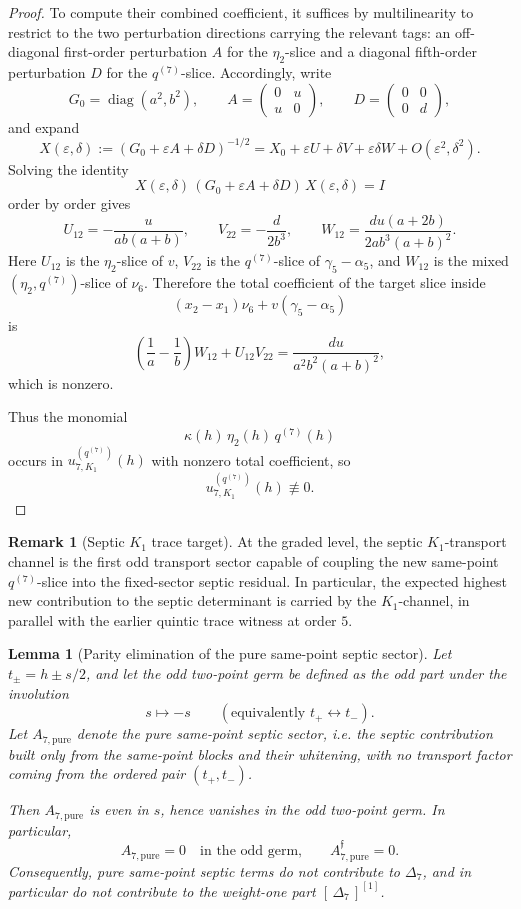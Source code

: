 \documentclass[11pt,a4paper]{amsart}
\theoremstyle{plain}
\newtheorem{lemma}[theorem]{Lemma}
\theoremstyle{definition}
\newtheorem{remark}[theorem]{Remark}
\newcommand{\diag}{\operatorname{diag}}
\begin{document}
\begin{proof}
To compute their combined coefficient, it suffices by multilinearity to
restrict to the two perturbation directions carrying the relevant tags:
an off-diagonal first-order perturbation $A$ for the $\eta_2$-slice and
a diagonal fifth-order perturbation $D$ for the $q^{(7)}$-slice.
Accordingly, write
\[
G_0=\diag(a^2,b^2),
\qquad
A=
\begin{pmatrix}
0&u\\u&0
\end{pmatrix},
\qquad
D=
\begin{pmatrix}
0&0\\0&d
\end{pmatrix},
\]
and expand
\[
X(\varepsilon,\delta):=(G_0+\varepsilon A+\delta D)^{-1/2}
=
X_0+\varepsilon U+\delta V+\varepsilon\delta W+O(\varepsilon^2,\delta^2).
\]
Solving the identity
\[
X(\varepsilon,\delta)\,(G_0+\varepsilon A+\delta D)\,X(\varepsilon,\delta)=I
\]
order by order gives
\[
U_{12}=-\frac{u}{ab(a+b)},
\qquad
V_{22}=-\frac{d}{2b^3},
\qquad
W_{12}=\frac{du(a+2b)}{2ab^3(a+b)^2}.
\]
Here $U_{12}$ is the $\eta_2$-slice of $v$, $V_{22}$ is the
$q^{(7)}$-slice of $\gamma_5-\alpha_5$, and $W_{12}$ is the mixed
$(\eta_2,q^{(7)})$-slice of $\nu_6$. Therefore the total coefficient of the
target slice inside
\[
(x_2-x_1)\nu_6+v(\gamma_5-\alpha_5)
\]
is
\[
\left(\frac1a-\frac1b\right)W_{12}+U_{12}V_{22}
=
\frac{du}{a^2b^2(a+b)^2},
\]
which is nonzero.

Thus the monomial
\[
\kappa(h)\,\eta_2(h)\,q^{(7)}(h)
\]
occurs in $u_{7,K_1}^{(q^{(7)})}(h)$ with nonzero total coefficient, so
\[
u_{7,K_1}^{(q^{(7)})}(h)\not\equiv 0.
\]
\end{proof}

\begin{remark}[Septic $K_1$ trace target]
\label{rem:septic-k1-trace-target}
At the graded level, the septic $K_1$-transport channel is the first odd
transport sector capable of coupling the new same-point $q^{(7)}$-slice into
the fixed-sector septic residual. In particular, the expected highest new
contribution to the septic determinant is carried by the $K_1$-channel, in
parallel with the earlier quintic trace witness at order $5$.
\end{remark}

\begin{lemma}[Parity elimination of the pure same-point septic sector]
\label{lem:parity-elimination-pure-septic}
Let $t_\pm=h\pm s/2$, and let the odd two-point germ be defined as the odd
part under the involution
\[
s\longmapsto -s
\qquad
(\text{equivalently }t_+\leftrightarrow t_-).
\]
Let $A_{7,\mathrm{pure}}$ denote the pure same-point septic sector, i.e. the
septic contribution built only from the same-point blocks and their whitening,
with no transport factor coming from the ordered pair $(t_+,t_-)$.

Then $A_{7,\mathrm{pure}}$ is even in $s$, hence vanishes in the odd
two-point germ. In particular,
\[
A_{7,\mathrm{pure}}=0
\quad\text{in the odd germ,}
\qquad
A_{7,\mathrm{pure}}^{\mathfrak f}=0.
\]
Consequently, pure same-point septic terms do not contribute to
$\Delta_7$, and in particular do not contribute to the weight-one part
$[\,\Delta_7\,]^{[1]}$.
\end{lemma}
\end{document}
